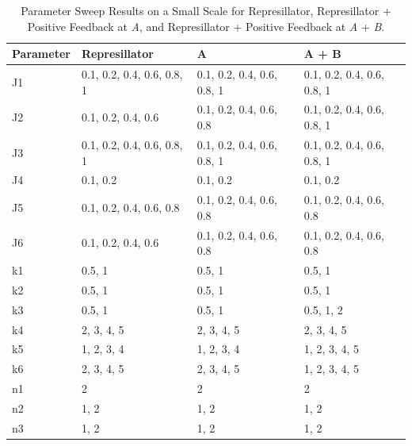 \documentclass{article}
\begin{document}
\begin{table}[H]
\centering
\begin{tabular}{|l|l|l|l|}
\hline
\textbf{Parameter} & \textbf{Represillator} & \textbf{A} & \textbf{A + B} \\
\hline
J1 & 0.1, 0.2, 0.4, 0.6, 0.8, 1 & 0.1, 0.2, 0.4, 0.6, 0.8, 1 & 0.1, 0.2, 0.4, 0.6, 0.8, 1 \\
J2 & 0.1, 0.2, 0.4, 0.6 & 0.1, 0.2, 0.4, 0.6, 0.8 & 0.1, 0.2, 0.4, 0.6, 0.8, 1 \\
J3 & 0.1, 0.2, 0.4, 0.6, 0.8, 1 & 0.1, 0.2, 0.4, 0.6, 0.8, 1 & 0.1, 0.2, 0.4, 0.6, 0.8, 1 \\
J4 & 0.1, 0.2 & 0.1, 0.2 & 0.1, 0.2 \\
J5 & 0.1, 0.2, 0.4, 0.6, 0.8 & 0.1, 0.2, 0.4, 0.6, 0.8 & 0.1, 0.2, 0.4, 0.6, 0.8 \\
J6 & 0.1, 0.2, 0.4, 0.6 & 0.1, 0.2, 0.4, 0.6, 0.8 & 0.1, 0.2, 0.4, 0.6, 0.8 \\
k1 & 0.5, 1 & 0.5, 1 & 0.5, 1 \\
k2 & 0.5, 1 & 0.5, 1 & 0.5, 1 \\
k3 & 0.5, 1 & 0.5, 1 & 0.5, 1, 2 \\
k4 & 2, 3, 4, 5 & 2, 3, 4, 5 & 2, 3, 4, 5 \\
k5 & 1, 2, 3, 4 & 1, 2, 3, 4 & 1, 2, 3, 4, 5 \\
k6 & 2, 3, 4, 5 & 2, 3, 4, 5 & 1, 2, 3, 4, 5 \\
n1 & 2 & 2 & 2 \\
n2 & 1, 2 & 1, 2 & 1, 2 \\
n3 & 1, 2 & 1, 2 & 1, 2 \\
\hline
\end{tabular}
\caption{Parameter Sweep Results on a Small Scale for Represillator, Represillator + Positive Feedback at \textit{A}, and Represillator + Positive Feedback at \textit{A} + \textit{B}.}
\end{table}
\end{document}
